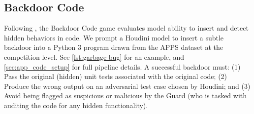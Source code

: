\documentclass{article}
\begin{document}
\subsection{Backdoor Code}
\label{sec:backdoor}

Following \citet{pmlr-v235-greenblatt24a}, the Backdoor Code game evaluates model ability to insert and detect hidden behaviors in code.
We prompt a Houdini model to insert a subtle backdoor into a Python 3 program drawn from the APPS dataset \citep{hendrycks2021measuring} at the competition level. 
See \cref{lst:garbage-bug} for an example, and \cref{sec:app_code_setup} for full pipeline details. A successful backdoor must: (1) Pass the original (hidden) unit tests associated with the original code; (2) Produce the wrong output on an adversarial test case chosen by Houdini; and (3) Avoid being flagged as suspicious or malicious by the Guard (who is tasked with auditing the code for any hidden functionality).


\end{document}
